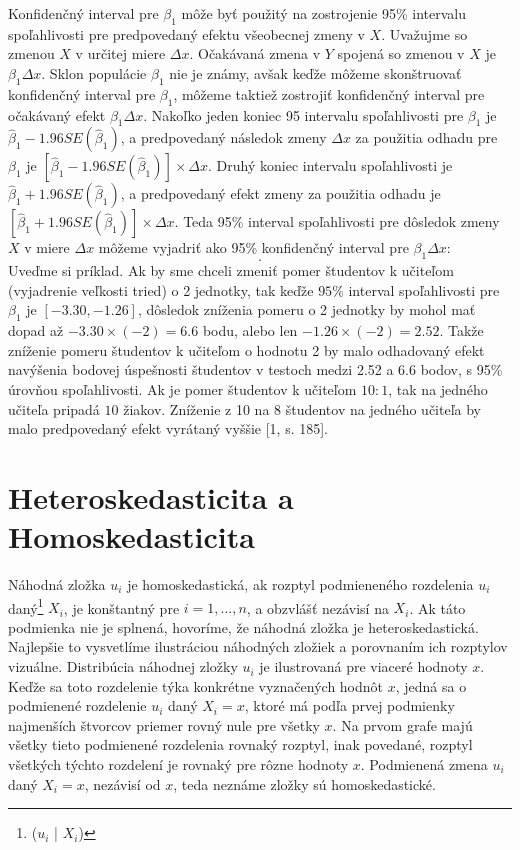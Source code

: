 \documentclass[]{tukediphc}
\begin{document}
Konfidenčný interval pre $\beta_1$ môže byť použitý na zostrojenie 95\% intervalu spoľahlivosti pre predpovedaný efektu všeobecnej zmeny v $X$. Uvažujme so zmenou $X$ v určitej miere $\Delta x$. Očakávaná zmena v $Y$ spojená so zmenou v $X$ je $\beta_{1} \Delta x$. Sklon populácie $\beta_1$ nie je známy, avšak keďže môžeme skonštruovať konfidenčný interval pre $\beta_1$, môžeme taktiež zostrojiť konfidenčný interval pre očakávaný efekt $\beta_{1} \Delta x$. Nakoľko jeden koniec 95 intervalu spoľahlivosti pre $\beta_1$ je $\hat\beta_{1} - 1.96SE(\hat\beta_{1})$, a predpovedaný následok zmeny $\Delta x$ za použitia odhadu pre $\beta_1$ je $[\hat\beta_{1} - 1.96SE(\hat\beta_{1})] \times \Delta x$. Druhý koniec intervalu spoľahlivosti je $\hat\beta_{1} + 1.96SE(\hat\beta_{1})$, a predpovedaný efekt zmeny za použitia odhadu je $[\hat\beta_{1} + 1.96SE(\hat\beta_{1})] \times \Delta x$. Teda 95\% interval spoľahlivosti pre dôsledok zmeny $X$ v miere $\Delta x$ môžeme vyjadriť ako 95\% konfidenčný interval pre $\beta_{1} \Delta x$:
\begin{equation}
   [\hat\beta_{1} - 1.96SE(\hat\beta_{1})\Delta x \ , \ \hat\beta_{1} + 1.96SE(\hat\beta_{1})\Delta x]. 
\end{equation}
Uveďme si príklad. Ak by sme chceli zmeniť pomer študentov k učiteľom (vyjadrenie veľkosti tried) o 2 jednotky, tak keďže $95\%$ interval spoľahlivosti pre $\beta_1$ je $[-3.30, -1.26]$, dôsledok zníženia pomeru o 2 jednotky by mohol mať dopad až $-3.30 \times (-2) = 6.6$ bodu, alebo len $-1.26 \times (-2) = 2.52$. Takže zníženie pomeru študentov k učiteľom o hodnotu 2 by malo odhadovaný efekt navýšenia bodovej úspešnosti študentov v testoch medzi 2.52 a 6.6 bodov, s 95\% úrovňou spoľahlivosti. Ak je pomer študentov k učiteľom $10:1$, tak na jedného učiteľa pripadá $10$ žiakov. Zníženie z 10 na 8 študentov na jedného učiteľa by malo predpovedaný efekt vyrátaný vyššie [1, s. 185]. 

\newpage
\section{Heteroskedasticita a Homoskedasticita}

Náhodná zložka ${u}_{i}$  je homoskedastická, ak rozptyl podmieneného rozdelenia ${u}_{i}$ daný\footnote{(${u}_{i}$ | $X_{i}$)} $X_{i}$, je konštantný pre $i = 1, ..., n$, a obzvlášť nezávisí na $X_{i}$. Ak táto podmienka nie je splnená, hovoríme, že náhodná zložka je heteroskedastická. Najlepšie to vysvetlíme ilustráciou náhodných zložiek a porovnaním ich rozptylov vizuálne. Distribúcia náhodnej zložky ${u}_{i}$ je ilustrovaná pre viaceré hodnoty $x$. Keďže sa toto rozdelenie týka konkrétne vyznačených hodnôt $x$, jedná sa o podmienené rozdelenie ${u}_{i}$ daný $X_{i} = x$, ktoré má podľa prvej podmienky najmenších štvorcov priemer rovný nule pre všetky $x$. Na prvom grafe majú všetky tieto podmienené rozdelenia rovnaký rozptyl, inak povedané, rozptyl všetkých týchto rozdelení je rovnaký pre rôzne hodnoty $x$. Podmienená zmena ${u}_{i}$ daný $X_{i} = x$, nezávisí od $x$, teda neznáme zložky sú homoskedastické. 
\end{document}
